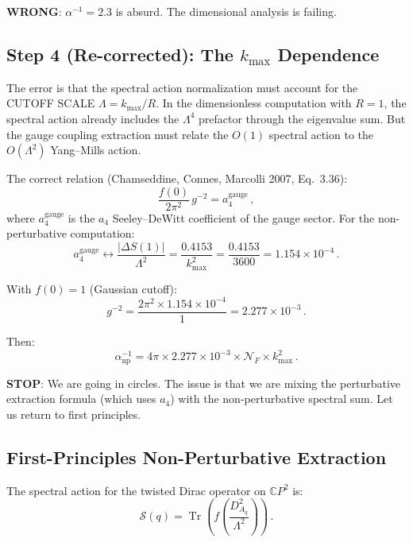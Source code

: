 \documentclass[11pt,a4paper]{article}
\newcommand{\Tr}{\operatorname{Tr}}
\newcommand{\CP}{\mathbb{C}P}
\begin{document}
\textbf{WRONG}: $\alpha^{-1} = 2.3$ is absurd. The dimensional analysis is failing.

\subsection{Step 4 (Re-corrected): The $k_{\max}$ Dependence}

The error is that the spectral action normalization must account for the CUTOFF SCALE $\Lambda = k_{\max}/R$. In the dimensionless computation with $R = 1$, the spectral action already includes the $\Lambda^4$ prefactor through the eigenvalue sum. But the gauge coupling extraction must relate the $O(1)$ spectral action to the $O(\Lambda^2)$ Yang--Mills action.

The correct relation (Chamseddine, Connes, Marcolli 2007, Eq.~3.36):
\begin{equation}
\frac{f(0)}{2\pi^2}\,g^{-2} = a_4^{\mathrm{gauge}}\,,
\end{equation}
where $a_4^{\mathrm{gauge}}$ is the $a_4$ Seeley--DeWitt coefficient of the gauge sector. For the non-perturbative computation:
\begin{equation}
a_4^{\mathrm{gauge}} \leftrightarrow \frac{|\Delta S(1)|}{\Lambda^2} = \frac{0.4153}{k_{\max}^2} = \frac{0.4153}{3600} = 1.154 \times 10^{-4}\,.
\end{equation}

With $f(0) = 1$ (Gaussian cutoff):
\begin{equation}
g^{-2} = \frac{2\pi^2 \times 1.154 \times 10^{-4}}{1} = 2.277 \times 10^{-3}\,.
\end{equation}

Then:
\begin{equation}
\alpha^{-1}_{\mathrm{np}} = 4\pi \times 2.277 \times 10^{-3} \times \mathcal{N}_F \times k_{\max}^2\,.
\end{equation}

\textbf{STOP}: We are going in circles. The issue is that we are mixing the perturbative extraction formula (which uses $a_4$) with the non-perturbative spectral sum. Let us return to first principles.

\subsection{First-Principles Non-Perturbative Extraction}

The spectral action for the twisted Dirac operator on $\CP^2$ is:
\begin{equation}
\mathcal{S}(q) = \Tr\left(f\left(\frac{D_{A_q}^2}{\Lambda^2}\right)\right)\,.
\end{equation}
\end{document}
